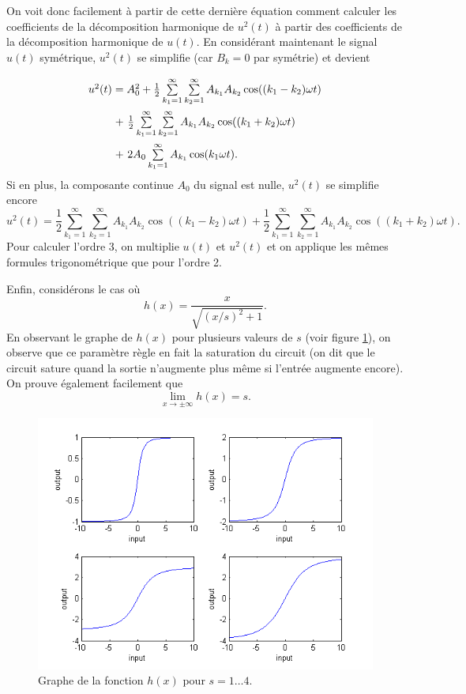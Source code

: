 On voit donc facilement à partir de cette dernière équation comment calculer
les coefficients de la décomposition harmonique de $u^2(t)$ à partir des
coefficients de la décomposition harmonique de $u(t)$. En considérant
maintenant le signal $u(t)$ symétrique, $u^2(t)$ se simplifie
(car $B_k = 0$ par symétrie) et devient
\[\arraycolsep=1.4pt\def\arraystretch{2.2}
	\begin{array}{cl}
		u^2(t) 	&= A^2_0 + \frac{1}{2}\sum\limits_{k_1=1}^\infty\sum\limits_{k_2=1}^\infty A_{k_1}A_{k_2}\cos((k_1-k_2)\omega t)\\
						&+~ \frac{1}{2}\sum\limits_{k_1=1}^\infty\sum\limits_{k_2=1}^\infty A_{k_1}A_{k_2}\cos((k_1+k_2)\omega t) \\
						&+~ 2A_0\sum\limits_{k_1=1}^\infty A_{k_1}\cos(k_1\omega t).
	\end{array}
\]
Si en plus, la composante continue $A_0$ du signal est nulle,
$u^2(t)$ se simplifie encore
\[ u^2(t) = \frac{1}{2}\sum\limits_{k_1=1}^\infty\sum\limits_{k_2=1}^\infty A_{k_1}A_{k_2}\cos((k_1-k_2)\omega t)
+ \frac{1}{2}\sum\limits_{k_1=1}^\infty\sum\limits_{k_2=1}^\infty A_{k_1}A_{k_2}\cos((k_1+k_2)\omega t). \]
Pour calculer l'ordre 3, on multiplie $u(t)$ et $u^2(t)$ et on applique
les mêmes formules trigonométrique que pour l'ordre 2.

Enfin, considérons le cas où 
\[ h(x) = \frac{x}{\sqrt{(x/s)^2+1}}.\]
En observant le graphe de $h(x)$ pour plusieurs
valeurs de $s$ (voir figure \ref{fig:non-linear-transfer}),
on observe que ce paramètre règle en fait la saturation du circuit
(on dit que le circuit sature quand la sortie n'augmente plus
même si l'entrée augmente encore). 
On prouve également facilement que
\[ \lim_{x\to\pm\infty} h(x) = s.\]

\begin{figure}[ht]
	\centering
	\includegraphics[scale=0.6]{img/non-linear-transfer.png}
	\caption{Graphe de la fonction $h(x)$ pour $s=1\dots4$.}
	\label{fig:non-linear-transfer}
\end{figure}

